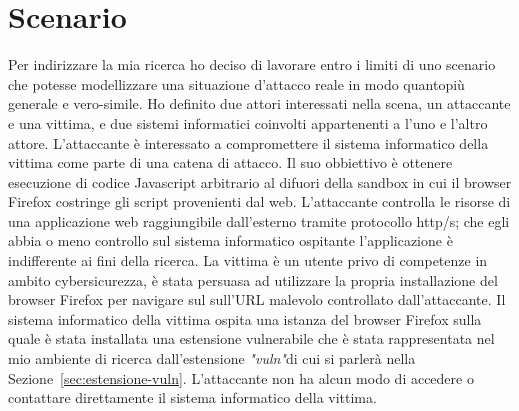 \documentclass{sapthesis}
\newcommand{\Sezione}[1]{Sezione~\ref{#1}}
\newcommand{\vuln}{\textit{"vuln"}}
\begin{document}
    \section{Scenario}
    \label{sec:threat-scenario}
        Per indirizzare la mia ricerca ho deciso di lavorare entro i limiti di uno scenario
        che potesse modellizzare una situazione d'attacco reale in modo quantopiù generale e vero-simile.
        Ho definito due attori interessati nella scena, un attaccante e una vittima, e due sistemi
        informatici coinvolti appartenenti a l'uno e l'altro attore.
        L'attaccante è interessato a compromettere il sistema informatico della vittima come parte di 
        una catena di attacco. Il suo obbiettivo è ottenere esecuzione di codice Javascript arbitrario
        al difuori della sandbox in cui il browser Firefox costringe gli script provenienti dal web.
        L'attaccante controlla le risorse di una applicazione web raggiungibile dall'esterno tramite 
        protocollo http/s; che egli abbia o meno controllo sul sistema informatico ospitante l'applicazione
        è indifferente ai fini della ricerca.
        La vittima è un utente privo di competenze in ambito cybersicurezza, è stata persuasa ad utilizzare
        la propria installazione del browser Firefox per navigare sul sull'URL malevolo controllato
        dall'attaccante.
        Il sistema informatico della vittima ospita una istanza del browser Firefox sulla
        quale è stata installata una estensione vulnerabile che è stata rappresentata nel mio ambiente
        di ricerca dall'estensione \vuln di cui si parlerà nella \Sezione{sec:estensione-vuln}.
        L'attaccante non ha alcun modo di accedere o contattare direttamente il sistema informatico della vittima. 
\end{document}
